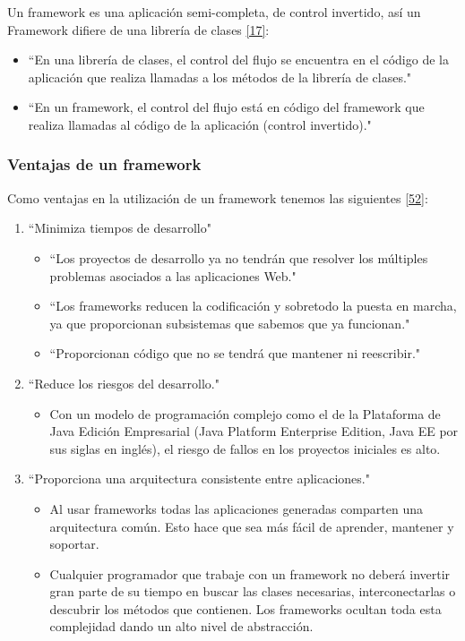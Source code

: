 Un framework es una aplicación semi-completa, de control invertido, así un Framework difiere de una librería de clases \hyperlink{b17}{[17]}: 
\begin{itemize}
	\item ``En una librería de clases, el control del flujo se encuentra en el código de la aplicación que realiza llamadas a los métodos de la librería de clases."
	\item ``En un framework, el control del flujo está en código del framework que realiza llamadas al código de la aplicación (control invertido)."
\end{itemize}
\subsubsection {Ventajas de un framework}
Como ventajas en la utilización de un framework tenemos las siguientes \hyperlink{b52}{[52]}: 

\begin{enumerate}
	\item ``Minimiza tiempos de desarrollo"
	\begin{itemize}
	\item ``Los proyectos de desarrollo ya no tendrán que resolver los múltiples problemas asociados a las aplicaciones Web."
	\item ``Los frameworks reducen la codificación y sobretodo la puesta en marcha, ya que proporcionan subsistemas que sabemos que ya funcionan."
	\item ``Proporcionan código que no se tendrá que mantener ni reescribir."
	\end{itemize}
	\item ``Reduce los riesgos del desarrollo."
	\begin{itemize}
		\item Con un modelo de programación complejo como el de la Plataforma de Java Edición Empresarial (Java Platform Enterprise Edition, Java EE por sus siglas en inglés), el riesgo de fallos en los proyectos iniciales es alto.
	\end{itemize}
	\item ``Proporciona una arquitectura consistente entre aplicaciones."
	\begin{itemize}
		\item Al usar frameworks todas las aplicaciones generadas comparten una arquitectura común. Esto hace que sea más fácil de aprender, mantener y soportar.
		\item Cualquier programador que trabaje con un framework no deberá invertir gran parte de su tiempo en buscar las clases necesarias, interconectarlas o descubrir los métodos que contienen. Los frameworks ocultan toda esta complejidad dando un alto nivel de abstracción. 
	\end{itemize}
\end{enumerate}

